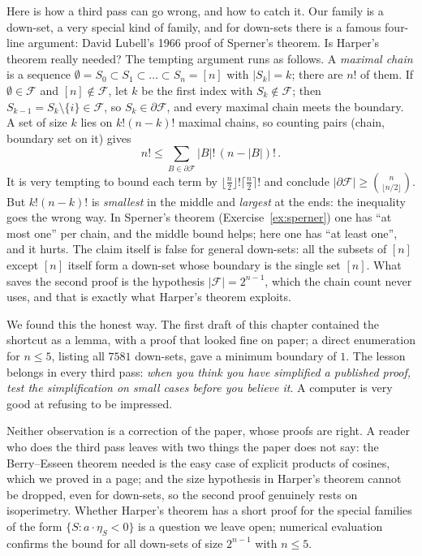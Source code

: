 Here is how a third pass can go wrong, and how to catch it. Our family is a down-set, a very special kind of family, and for down-sets there is
a famous four-line argument: David Lubell's 1966 proof of Sperner's theorem. Is Harper's theorem really needed? The tempting argument runs as follows.
A \emph{maximal chain} is a sequence $\emptyset=S_0\subset S_1\subset\dots\subset S_n=[n]$ with $|S_k|=k$; there are $n!$ of them. If $\emptyset\in\mathcal F$ and $[n]\notin\mathcal F$, let $k$ be the first index with
$S_k\notin\mathcal F$; then $S_{k-1}=S_k\setminus\{i\}\in\mathcal F$, so $S_k\in\partial\mathcal F$, and every maximal chain meets the boundary. A set of size $k$ lies on $k!(n-k)!$ maximal chains, so counting
pairs (chain, boundary set on it) gives
\[
n!\le\sum_{B\in\partial\mathcal F}|B|!\,(n-|B|)!\,.
\]
It is very tempting to bound each term by $\lfloor\frac n2\rfloor!\lceil\frac n2\rceil!$ and conclude $|\partial\mathcal F|\ge\binom n{\lfloor n/2\rfloor}$. But $k!(n-k)!$ is \emph{smallest} in the middle and
\emph{largest} at the ends: the inequality goes the wrong way. In Sperner's theorem (Exercise~\ref{ex:sperner}) one has ``at most one'' per chain, and the
middle bound helps; here one has ``at least one'', and it hurts. The claim itself is false for general down-sets: all the subsets of $[n]$ except
$[n]$ itself form a down-set whose boundary is the single set $[n]$. What saves the second proof is the hypothesis $|\mathcal F|=2^{n-1}$, which the chain count
never uses, and that is exactly what Harper's theorem exploits.

We found this the honest way. The first draft of this chapter contained the shortcut as a lemma, with a proof that looked fine on paper; a direct enumeration for $n\le5$, listing all $7581$ down-sets, gave a minimum boundary of $1$. The lesson belongs in every third
pass: \emph{when you think you have simplified a published proof, test the simplification on small cases before you believe it}. A computer is
very good at refusing to be impressed.

\begin{remark}
Neither observation is a correction of the paper, whose proofs are right. A reader who does the third pass leaves with two things the paper does
not say: the Berry--Esseen theorem needed is the easy case of explicit products of cosines, which we proved in a page; and the size hypothesis in
Harper's theorem cannot be dropped, even for down-sets, so the second proof genuinely rests on isoperimetry. Whether Harper's theorem has a short
proof for the special families of the form $\{S:a\cdot\eta_S<0\}$ is a question we leave open; numerical evaluation confirms the bound for all down-sets of size $2^{n-1}$ with $n\le5$.
\end{remark}


